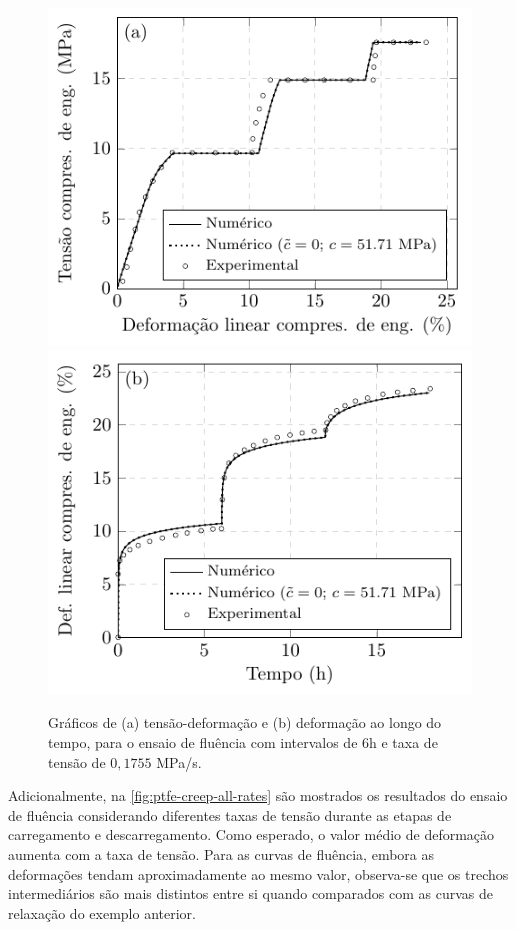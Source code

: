 \documentclass[Tese.tex]{subfiles}
\begin{document}
{\begin{figure}[!htb]
	\centering
	\caption{Gráficos de (a) tensão-deformação e (b) deformação ao longo do tempo, para o ensaio de fluência com intervalos de $6$h e taxa de tensão de $0,1755$ MPa/s.}
	\label{fig:ptfe-creep}
	\includegraphics[scale=1.0]{Figuras/PTFE/creep.pdf}\;\;\includegraphics[scale=1.0]{Figuras/PTFE/creep-e.pdf}		
\end{figure}

Adicionalmente, na \autoref{fig:ptfe-creep-all-rates} são mostrados os resultados do ensaio de fluência considerando diferentes taxas de tensão durante as etapas de carregamento e descarregamento. Como esperado, o valor médio de deformação aumenta com a taxa de tensão. Para as curvas de fluência, embora as deformações tendam aproximadamente ao mesmo valor, observa-se que os trechos intermediários são mais distintos entre si quando comparados com as curvas de relaxação do exemplo anterior.

}
\end{document}
